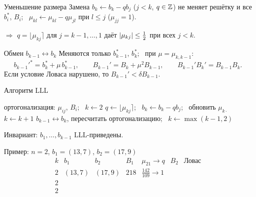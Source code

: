 \documentclass{ca-slides}
\begin{document}
\begin{theoremframe}[lemma]{Уменьшение размера}
  Замена $b_k \gets b_k - q b_j$ ($j < k$, $q \in \mathbb{Z}$) не меняет решётку и все $b_i^*$, $B_i$;
  \ $\mu_{kl} \gets \mu_{kl} - q \mu_{jl}$ при $l \le j$ ($\mu_{jj} = 1$).
  \par\smallskip
  $\Rightarrow$ $q = \lfloor \mu_{kj} \rceil$ для $j = k - 1, \dots, 1$ даёт
  $\lvert\mu_{kj}\rvert \le \tfrac12$ при всех $j < k$.
\end{theoremframe}

\begin{theoremframe}[lemma]{Обмен $b_{k-1} \leftrightarrow b_k$}
  Меняются только $b_{k-1}^*$, $b_k^*$; \ при $\mu = \mu_{k,k-1}$:
  \[
    b_{k-1}'^* = b_k^* + \mu\, b_{k-1}^*, \qquad B_{k-1}' = B_k + \mu^2 B_{k-1}, \qquad
    B_{k-1}' B_k' = B_{k-1} B_k.
  \]
  Если условие Ловаса нарушено, то $B_{k-1}' < \delta B_{k-1}$.
\end{theoremframe}

\begin{canvasframe}{Алгоритм LLL}
  \small
  \begin{algorithmic}[1]
    \State ортогонализация: $\mu_{ij}$, $B_i$; \ $k \gets 2$
        \State $q \gets \lfloor \mu_{kj} \rceil$; \ $b_k \gets b_k - q b_j$; \
          обновить $\mu_{k\cdot}$ 
      \EndFor
       
        \State $k \gets k + 1$
      \Else
        \State $b_{k-1} \leftrightarrow b_k$, пересчитать ортогонализацию; \
          $k \gets \max(k - 1, 2)$
      \EndIf
    \EndWhile
  \end{algorithmic}
  \medskip
  Инвариант: $b_1, \dots, b_{k-1}$ LLL-приведены.
\end{canvasframe}

\begin{canvasframe}{Пример: $n = 2$, $b_1 = (13, 7)$, $b_2 = (17, 9)$}
  \[
    \begin{array}{c|c|c|c|c|c|c}
      k & b_1 & b_2 & B_1 & \mu_{21} \to q & B_2 & \text{Ловас} \\ \hline
      2 & (13, 7) & (17, 9) & 218 & \tfrac{142}{109} \to 1 & & \\[8pt]
      2 & & & & & & \\[8pt]
      2 & & & & & & \\[8pt]
    \end{array}
  \]
  \notearea[0.1\textheight]
\end{canvasframe}
\end{document}
